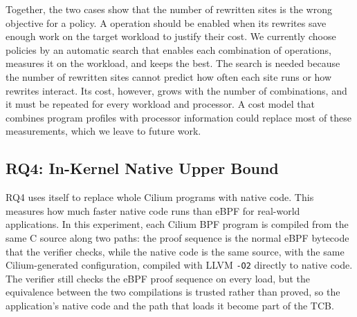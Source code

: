 Together, the two cases show that the number of rewritten sites is the wrong objective for a \lang policy.
A \lang operation should be enabled when its rewrites save enough work on the target workload to justify their cost.
We currently choose policies by an automatic search that enables each combination of \lang operations, measures it on the workload, and keeps the best.
The search is needed because the number of rewritten sites cannot predict how often each site runs or how rewrites interact.
Its cost, however, grows with the number of combinations, and it must be repeated for every workload and processor.
A cost model that combines program profiles with processor information could replace most of these measurements, which we leave to future work.


\subsection{RQ4: In-Kernel Native Upper Bound}
\label{subsec:native_upper_bound}

RQ4 uses \tool itself to replace whole Cilium programs with native code.
This measures how much faster native code runs than eBPF for real-world applications.
In this experiment, each Cilium BPF program is compiled from the same C source along two paths: the proof sequence is the normal eBPF bytecode that the verifier checks, while the native code is the same source, with the same Cilium-generated configuration, compiled with LLVM \texttt{-O2} directly to native code.
The verifier still checks the eBPF proof sequence on every load, but the equivalence between the two compilations is trusted rather than proved, so the application's native code and the path that loads it become part of the TCB.


